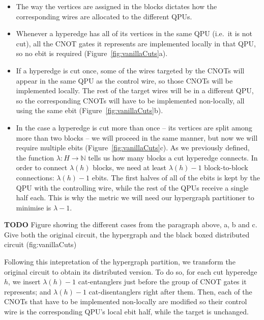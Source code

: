 \begin{itemize}

  \item The way the vertices are assigned in the blocks dictates how the corresponding wires are allocated to the different QPUs. 
  \item Whenever a hyperedge has all of its vertices in the same QPU (i.e.\ it is not cut), all the CNOT gates it represents are implemented locally in that QPU, so no ebit is required (Figure~\ref{fig:vanillaCuts}a). 
  \item If a hyperedge is cut once, some of the wires targeted by the CNOTs will appear in the same QPU as the control wire, so those CNOTs will be implemented locally. The rest of the target wires will be in a different QPU, so the corresponding CNOTs will have to be implemented non-locally, all using the same ebit (Figure~\ref{fig:vanillaCuts}b). 
  \item In the case a hyperedge is cut more than once -- its vertices are split among more than two blocks -- we will proceed in the same manner, but now we will require multiple ebits (Figure~\ref{fig:vanillaCuts}c). As we previously defined, the function \(\lambda\colon H \to \mathbb{N}\) tells us how many blocks a cut hyperedge connects. In order to connect \(\lambda(h)\) blocks, we need at least \(\lambda(h)-1\) block-to-block connections: \(\lambda(h)-1\) ebits. The first halves of all of the ebits is kept by the QPU with the controlling wire, while the rest of the QPUs receive a single half each. This is why the metric we will need our hypergraph partitioner to minimise is \(\lambda-1\).
\end{itemize}

\textbf{TODO} Figure showing the different cases from the paragraph above, a, b and c. Give both the original circuit, the hypergraph and the black boxed distributed circuit (fig:vanillaCuts)


Following this intepretation of the hypergraph partition, we transform the original circuit to obtain its distributed version. To do so, for each cut hyperedge \(h\), we insert \(\lambda(h)-1\) cat-entanglers just before the group of CNOT gates it represents; and \(\lambda(h)-1\) cat-disentanglers right after them. Then, each of the CNOTs that have to be implemented non-locally are modified so their control wire is the corresponding QPU's local ebit half, while the target is unchanged.


